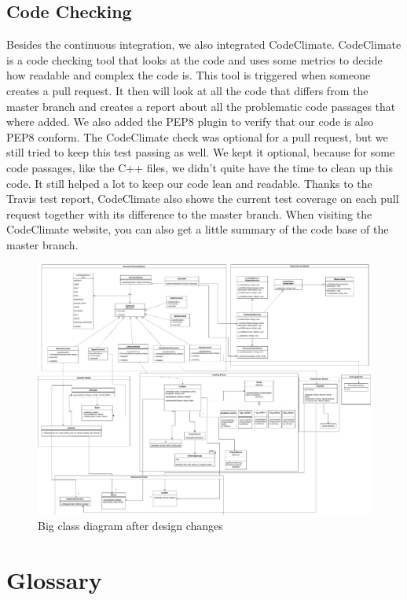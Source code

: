 \documentclass[parskip=full]{scrartcl}
\begin{document}
\subsection{Code Checking}
Besides the continuous integration, we also integrated \gls{CodeClimate}.
\gls{CodeClimate} is a code checking tool that looks at the code and uses some metrics to decide how readable and complex the code is.
This tool is triggered when someone creates a pull request.
It then will look at all the code that differs from the master branch and creates a report about all the problematic code passages that where added.
We also added the \gls{PEP8} plugin to verify that our code is also \gls{PEP8} conform.
The \gls{CodeClimate} check was optional for a pull request, but we still tried to keep this test passing as well.
We kept it optional, because for some code passages, like the \gls{C++} files, we didn't quite have the time to clean up this code.
It still helped a lot to keep our code lean and readable.
Thanks to the \gls{Travis} test report, \gls{CodeClimate} also shows the current test coverage on each pull request together with its difference to the master branch.
When visiting the \gls{CodeClimate} website, you can also get a little summary of the code base of the master branch.



\newpage

\begin{figure}
    \includegraphics[width=\textwidth, height= \textheight, keepaspectratio]{../Big_classdiagram/Big_classdiagram.pdf}
    \caption{Big class diagram after design changes}
    \label{fig:PropProf}
\end{figure}


\newpage
\section{Glossary}

%
\printnoidxglossaries
\end{document}

